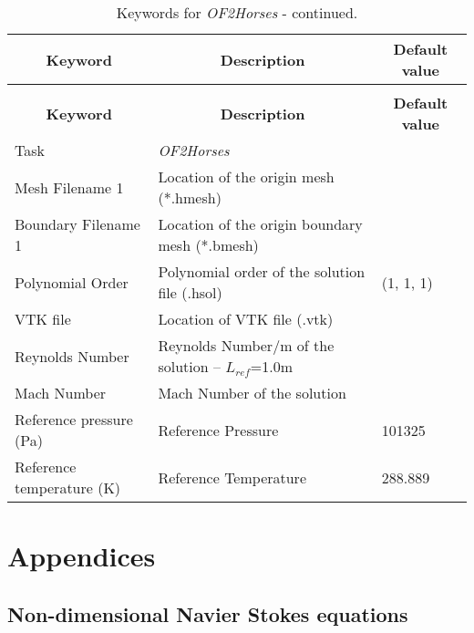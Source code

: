 \documentclass[a4paper,10pt]{report}
\begin{document}
\begin{longtable}{|p{5cm}|p{9cm}|p{2.2cm}|}
\caption{Keywords for \textit{OF2Horses}.} \label{tab:OF2Horses} \\
\hline
\multicolumn{1}{|c|}{\textbf{Keyword}} & \multicolumn{1}{c|}{\textbf{Description}} & \multicolumn{1}{c|}{\textbf{Default value}} \\ \hline
\endfirsthead

\caption{Keywords for \textit{OF2Horses} - continued.} \\
\hline
\multicolumn{1}{|c|}{\textbf{Keyword}} & \multicolumn{1}{c|}{\textbf{Description}} & \multicolumn{1}{c|}{\textbf{Default value}} \\ \hline
\endhead

Task 	        		& \textit{OF2Horses} 						&  \\ \hline
Mesh Filename 1 		& Location of the origin mesh (*.hmesh) 	&  \\ \hline
Boundary Filename 1 	& Location of the origin boundary mesh (*.bmesh) 	&  \\ \hline
Polynomial Order 	& Polynomial order of the solution file (.hsol)  & (1, 1, 1) \\ \hline
VTK file         	& Location of VTK file (.vtk)   &             \\ \hline
Reynolds Number    	& Reynolds Number/m of the solution -- $L_{ref}$=1.0m   &             \\ \hline
Mach Number         	& Mach Number of the solution      &             \\ \hline
Reference pressure (Pa)         	& Reference Pressure   & 101325             \\ \hline
Reference temperature (K)        & Reference Temperature   & 288.889             \\ \hline

\end{longtable}



\clearpage
\section*{Appendices}

\subsection*{Non-dimensional Navier Stokes equations}
\end{document}
